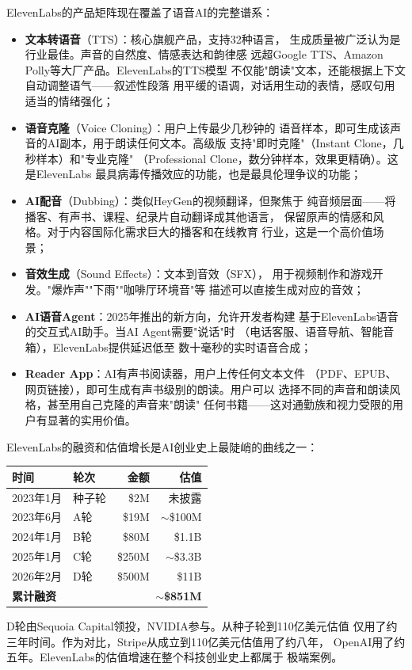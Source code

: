 ElevenLabs的产品矩阵现在覆盖了语音AI的完整谱系：

\begin{itemize}
  \item \textbf{文本转语音}（TTS）：核心旗舰产品，支持32种语言，
    生成质量被广泛认为是行业最佳。声音的自然度、情感表达和韵律感
    远超Google TTS、Amazon Polly等大厂产品。ElevenLabs的TTS模型
    不仅能"朗读"文本，还能根据上下文自动调整语气——叙述性段落
    用平缓的语调，对话用生动的表情，感叹句用适当的情绪强化；
  \item \textbf{语音克隆}（Voice Cloning）：用户上传最少几秒钟的
    语音样本，即可生成该声音的AI副本，用于朗读任何文本。高级版
    支持"即时克隆"（Instant Clone，几秒样本）和"专业克隆"
    （Professional Clone，数分钟样本，效果更精确）。这是ElevenLabs
    最具病毒传播效应的功能，也是最具伦理争议的功能；
  \item \textbf{AI配音}（Dubbing）：类似HeyGen的视频翻译，但聚焦于
    纯音频层面——将播客、有声书、课程、纪录片自动翻译成其他语言，
    保留原声的情感和风格。对于内容国际化需求巨大的播客和在线教育
    行业，这是一个高价值场景；
  \item \textbf{音效生成}（Sound Effects）：文本到音效（SFX），
    用于视频制作和游戏开发。"爆炸声""下雨""咖啡厅环境音"等
    描述可以直接生成对应的音效；
  \item \textbf{AI语音Agent}：2025年推出的新方向，允许开发者构建
    基于ElevenLabs语音的交互式AI助手。当AI Agent需要"说话"时
    （电话客服、语音导航、智能音箱），ElevenLabs提供延迟低至
    数十毫秒的实时语音合成；
  \item \textbf{Reader App}：AI有声书阅读器，用户上传任何文本文件
    （PDF、EPUB、网页链接），即可生成有声书级别的朗读。用户可以
    选择不同的声音和朗读风格，甚至用自己克隆的声音来"朗读"
    任何书籍——这对通勤族和视力受限的用户有显著的实用价值。
\end{itemize}

ElevenLabs的融资和估值增长是AI创业史上最陡峭的曲线之一：

\begin{keybox}
\small
\begin{tabularx}{\textwidth}{l l r r}
\toprule
\rowcolor{figLightGray}
\textbf{时间} & \textbf{轮次} & \textbf{金额} & \textbf{估值} \\
\midrule
2023年1月   & 种子轮   & \$2M       & 未披露 \\
2023年6月   & A轮      & \$19M      & $\sim$\$100M \\
2024年1月   & B轮      & \$80M      & \$1.1B \\
2025年1月   & C轮      & \$250M     & $\sim$\$3.3B \\
2026年2月   & D轮      & \$500M     & \$11B \\
\midrule
\multicolumn{2}{l}{\textbf{累计融资}} & \multicolumn{2}{r}{\textbf{$\sim$\$851M}} \\
\bottomrule
\end{tabularx}

\medskip
\noindent D轮由Sequoia Capital领投，NVIDIA参与。从种子轮到110亿美元估值
仅用了约三年时间。作为对比，Stripe从成立到110亿美元估值用了约八年，
OpenAI用了约五年。ElevenLabs的估值增速在整个科技创业史上都属于
极端案例。
\end{keybox}

